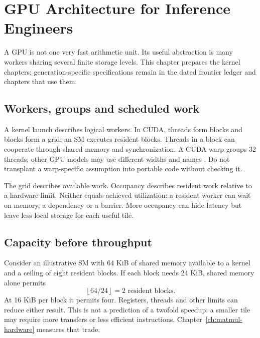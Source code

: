 \chapter{GPU Architecture for Inference Engineers}\label{app:gpu}
\begin{ChapterIntent}
A GPU is not one very fast arithmetic unit. Its useful abstraction is many
workers sharing several finite storage levels. This chapter prepares the
kernel chapters; generation-specific specifications remain in the dated
frontier ledger and chapters that use them.
\end{ChapterIntent}

\section{Workers, groups and scheduled work}
A kernel launch describes logical workers. In CUDA, threads form blocks
and blocks form a grid; an SM executes resident blocks. Threads in a block
can cooperate through shared memory and synchronization. A CUDA warp
groups 32 threads; other GPU models may use different widths and names
\cite{nvidia2026programmingmodel}. Do not transplant a warp-specific
assumption into portable code without checking it.

The grid describes available work. Occupancy describes resident work
relative to a hardware limit. Neither equals achieved utilization: a
resident worker can wait on memory, a dependency or a barrier. More
occupancy can hide latency but leave less local storage for each useful tile.

\section{Capacity before throughput}
Consider an illustrative SM with 64 KiB of shared memory available to a
kernel and a ceiling of eight resident blocks. If each block needs 24 KiB,
shared memory alone permits
\[
 \left\lfloor 64/24\right\rfloor=2\text{ resident blocks}.
\]
At 16 KiB per block it permits four. Registers, threads and other limits
can reduce either result. This is not a prediction of a twofold speedup:
a smaller tile may require more transfers or less efficient instructions.
Chapter~\ref{ch:matmul-hardware} measures that trade.


